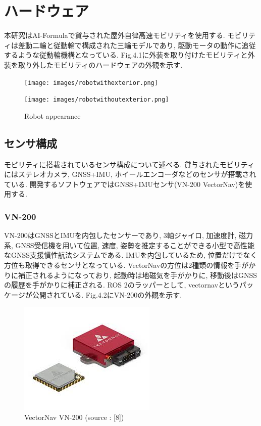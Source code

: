 
\section{ハードウェア}
本研究はAI-Formulaで貸与された屋外自律高速モビリティを使用する.
モビリティは差動二輪と従動輪で構成された三輪モデルであり, 駆動モータの動作に追従するような従動輪機構となっている.
Fig.4.1に外装を取り付けたモビリティと外装を取り外したモビリティのハードウェアの外観を示す.

\begin{figure}[h]
     \centering
     \begin{minipage}[c]{65mm}
         \centering
         \texttt{[image: images/robotwithexterior.png]}
     \end{minipage}
     \begin{minipage}[c]{65mm}
         \centering
         \texttt{[image: images/robotwithoutexterior.png]}
     \end{minipage}
     \caption{Robot appearance}
     \label{Fig:RobotGuidance_velocity}
\end{figure}

\subsection{センサ構成}
モビリティに搭載されているセンサ構成について述べる.
貸与されたモビリティにはステレオカメラ, GNSS+IMU, ホイールエンコーダなどのセンサが搭載されている.
開発するソフトウェアではGNSS+IMUセンサ(VN-200 VectorNav)を使用する.

\subsubsection{VN-200}
VN-200\cite{vn-200}はGNSSとIMUを内包したセンサーであり, 3軸ジャイロ, 加速度計, 磁力系, GNSS受信機を用いて位置, 速度, 姿勢を推定することができる小型で高性能なGNSS支援慣性航法システムである.
IMUを内包しているため, 位置だけでなく方位も取得できるセンサとなっている.
VectorNavの方位は2種類の情報を手がかりに補正されるようになっており, 起動時は地磁気を手がかりに, 移動後はGNSSの履歴を手がかりに補正される.
ROS 2のラッパーとして, vectornavというパッケージが公開されている.\cite{vectornav}
Fig.4.2にVN-200の外観を示す.

\begin{figure}[H]
  \centering
 \includegraphics[keepaspectratio, scale=0.6]
      {images/vn-200.png}
 \caption{VectorNav VN-200 (source : [8])}
 \label{fig:vn-200 view}
\end{figure}

